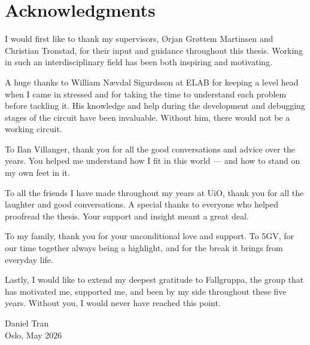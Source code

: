 \chapter*{Acknowledgments}

I would first like to thank my supervisors, Ørjan Grøttem Martinsen and Christian Tronstad, for their input and guidance throughout this thesis. Working in such an interdisciplinary field has been both inspiring and motivating.

A huge thanks to William Nævdal Sigurdsson at ELAB for keeping a level head when I came in stressed and for taking the time to understand each problem before tackling it. His knowledge and help during the development and debugging stages of the circuit have been invaluable. Without him, there would not be a working circuit.

To Ilan Villanger, thank you for all the good conversations and advice over the years. You helped me understand how I fit in this world — and how to stand on my own feet in it.

To all the friends I have made throughout my years at UiO, thank you for all the laughter and good conversations. A special thanks to everyone who helped proofread the thesis. Your support and insight meant a great deal.

To my family, thank you for your unconditional love and support. To 5GV, for our time together always being a highlight, and for the
break it brings from everyday life.

Lastly, I would like to extend my deepest gratitude to Fallgruppa, the group that has motivated me, supported me, and been by my side throughout these five years. Without you, I would never have reached this point.

\vspace{1em}
\noindent Daniel Tran \\
Oslo, May 2026